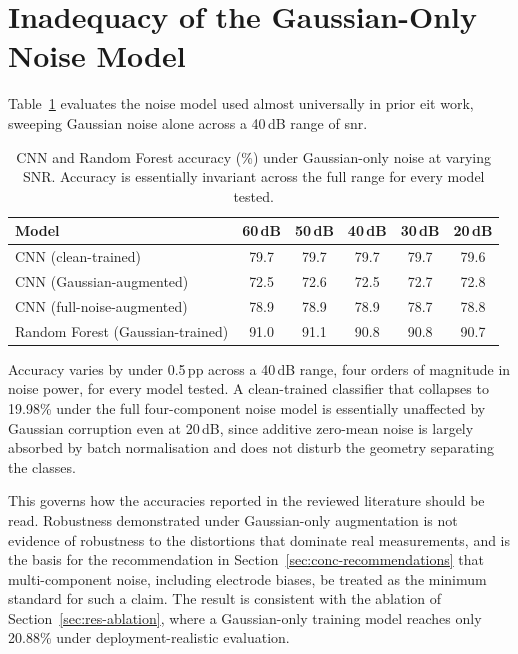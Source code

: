 \section{Inadequacy of the Gaussian-Only Noise Model}
\label{app:gaussian-only}

Table~\ref{tab:app-gaussian-only} evaluates the noise model used almost universally in prior \gls{eit} work, sweeping Gaussian noise alone across a 40\,dB range of \gls{snr}.

\begin{table}[htbp]
\centering
\caption[Accuracy under Gaussian-only noise at varying SNR]{CNN and Random Forest accuracy (\%) under Gaussian-only noise at varying SNR. Accuracy is essentially invariant across the full range for every model tested.}
\label{tab:app-gaussian-only}
\small
\setlength{\tabcolsep}{7pt}
\begin{tabular}{@{}lccccc@{}}
\toprule
\textbf{Model} & \textbf{60\,dB} & \textbf{50\,dB} & \textbf{40\,dB} & \textbf{30\,dB} & \textbf{20\,dB} \\
\midrule
CNN (clean-trained)              & 79.7 & 79.7 & 79.7 & 79.7 & 79.6 \\
CNN (Gaussian-augmented)         & 72.5 & 72.6 & 72.5 & 72.7 & 72.8 \\
CNN (full-noise-augmented)       & 78.9 & 78.9 & 78.9 & 78.7 & 78.8 \\
Random Forest (Gaussian-trained) & 91.0 & 91.1 & 90.8 & 90.8 & 90.7 \\
\bottomrule
\end{tabular}
\end{table}

Accuracy varies by under 0.5\,pp across a 40\,dB range, four orders of magnitude in noise power, for every model tested. A clean-trained classifier that collapses to 19.98\% under the full four-component noise model is essentially unaffected by Gaussian corruption even at 20\,dB, since additive zero-mean noise is largely absorbed by batch normalisation \parencite{ioffe2015batchnorm} and does not disturb the geometry separating the classes.

This governs how the accuracies reported in the reviewed literature should be read. Robustness demonstrated under Gaussian-only augmentation \parencite{chen2023, park2022skin} is not evidence of robustness to the distortions that dominate real measurements, and is the basis for the recommendation in Section~\ref{sec:conc-recommendations} that multi-component noise, including electrode biases, be treated as the minimum standard for such a claim. The result is consistent with the ablation of Section~\ref{sec:res-ablation}, where a Gaussian-only training model reaches only 20.88\% under deployment-realistic evaluation.

